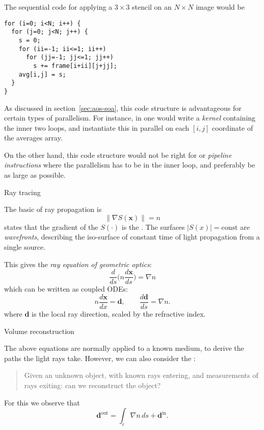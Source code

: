 The sequential code for applying a $3\times 3$ stencil
on an $N\times N$ image
would be
\begin{verbatim}
for (i=0; i<N; i++) {
  for (j=0; j<N; j++) {
    s = 0;
    for (ii=-1; ii<=1; ii++)
      for (jj=-1; jj<=1; jj++)
        s += frame[i+ii][j+jj];
    avg[i,j] = s;
  }
}
\end{verbatim}

As discussed in section~\ref{sec:aos-soa}, this code structure
is advantageous for certain types of parallelism. For instance,
in  one would write a \emph{kernel}
containing the inner two loops, and instantiate this
in parallel on each $[i,j]$ coordinate of the averages array.

On the other hand, this code structure would not be right for
 or \emph{pipeline
  instructions} where the parallelism has
to be in the inner loop, and preferably be as large as possible.

 {Ray tracing}

The basic  of ray propagation is
\begin{equation}
  \| \nabla S(\mathbf x) \| = n
  \label{eq:ekonal}
\end{equation}
states that the gradient of the  $S(\cdot)$ is
the . The surfaces
$|S(x)|=\mathrm{const}$ are
\emph{wavefronts},
describing the iso-surface of constant time of light propagation from
a single source.

This gives the \emph{ray equation of geometric optics}:
\begin{equation}
  \frac{d}{ds}\bigl( n\frac{d\mathbf x}{ds} \bigr)
  = \nabla n
\end{equation}
which can be written as coupled \acp{ODE}:
\begin{equation}
  n\frac{d\mathbf{x}}{dx}=\mathbf{d}, \qquad
  \frac{d\mathbf{d}}{ds} = \nabla n.
\end{equation}
where $\mathbf{d}$ is the local ray direction, scaled by the
refractive index.

 {Volume reconstruction}

The above equations are normally applied to a known medium, to derive
the paths the light rays take. However, we can also consider the
:
\begin{quotation}
  Given an unknown object, with known rays entering, and measurements of
  rays exiting: can we reconstruct the object?
\end{quotation}
For this we observe that
\begin{equation}
  \mathbf{d}^{\scriptstyle\mathrm{out}} =
  \int_c \nabla n\, ds
  +
  \mathbf{d}^{\scriptstyle\mathrm{in}}.
\end{equation}


